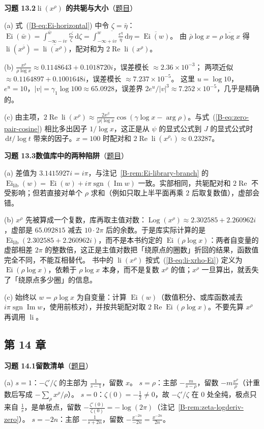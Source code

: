 \documentclass[11pt,a4paper]{article}
\DeclareMathOperator{\li}{li}
\DeclareMathOperator{\Ei}{Ei}
\newcommand{\dd}{\,\mathrm{d}}
\renewcommand{\Re}{\operatorname{Re}}
\renewcommand{\Im}{\operatorname{Im}}
\newcommand{\bref}[1]{\ref*{B-#1}}
\newcommand{\Sol}[2]{%
  \par\addvspace{1.2em}\noindent
  \hypertarget{s:#1}{}\textbf{习题 #1\quad #2}\hfill{\small（\hyperlink{q:#1}{题目}）}\par
  \nopagebreak\smallskip}
\begin{document}
\Sol{13.2}{$\li(x^\rho)$ 的共轭与大小}
(a) 式~(\bref{eq:Ei-horizontal}) 中令 $\zeta=\bar\eta$：
$\Ei(\bar w)=\int_{-\infty-iv}^{\bar w}\frac{e^\zeta}\zeta\dd\zeta=\overline{\int_{-\infty+iv}^{w}\frac{e^\eta}\eta\dd\eta}=\overline{\Ei(w)}$。
由 $\bar\rho\log x=\overline{\rho\log x}$ 得 $\li(x^{\bar\rho})=\overline{\li(x^\rho)}$，配对和为 $2\Re\li(x^\rho)$。

(b) $\frac{x^\rho}{\rho\log x}\approx0.1148643+0.1018720i$，误差模长 $\approx2.36\times10^{-3}$；
两项近似 $\approx0.1164897+0.1001648i$，误差模长 $\approx7.237\times10^{-5}$。
这里 $u=\log10$，$e^u=10$，$|v|=\gamma_1\log100\approx65.0928$，误差界 $2e^u/|v|^3\approx7.252\times10^{-5}$，几乎是精确的。

(c) 由主项，$2\Re\li(x^\rho)\approx\frac{2x^\beta}{|\rho|\log x}\cos(\gamma\log x-\arg\rho)$。与式~(\bref{eq:zero-pair-cosine}) 相比多出因子 $1/\log x$，这正是从 $\psi$ 的显式公式到 $J$ 的显式公式时 $\dd t/\log t$ 带来的因子。$x=100$ 时配对和 $2\Re\li(x^{\rho_1})\approx0.23287$。

\Sol{13.3}{数值库中的两种陷阱}
(a) 差值为 $3.1415927i=i\pi$，与注记~\bref{rem:Ei-library-branch} 的 $\Ei_{\mathrm{lib}}(w)=\Ei(w)+i\pi\operatorname{sgn}(\Im w)$ 一致。实部相同，共轭配对和 $2\Re$ 不受影响；但若直接对单个 $\rho$ 求和（例如只取上半平面再乘 $2$ 后取复数值），虚部会错。

(b) $x^\rho$ 先被算成一个复数，库再取主值对数：$\operatorname{Log}(x^\rho)\approx2.302585+2.260962i$，虚部是 $65.092815$ 减去 $10\cdot2\pi$ 后的余数。于是库实际计算的是 $\Ei_{\mathrm{lib}}(2.302585+2.260962i)$，而不是本书约定的 $\Ei(\rho\log x)$：两者自变量的虚部相差 $2\pi$ 的整数倍，这正是主值对数把「绕原点的圈数」折回的结果，函数值完全不同，不能互相替代。
书中的 $\li(x^\rho)$ 按式~(\bref{eq:li-xrho-Ei}) 定义为 $\Ei(\rho\log x)$，依赖于 $\rho\log x$ 本身，而不是复数 $x^\rho$ 的值；$x^\rho$ 一旦算出，就丢失了「绕原点多少圈」的信息。

(c) 始终以 $w=\rho\log x$ 为自变量：计算 $\Ei(w)$（数值积分、或库函数减去 $i\pi\operatorname{sgn}\Im w$，使用前核对），并按共轭配对取 $2\Re\Ei(\rho\log x)$。不要先算 $x^\rho$ 再调用 $\li$。

\subsection*{第 14 章}

\Sol{14.1}{留数清单}
(a) $s=1$：$-\zeta'/\zeta$ 的主部为 $\frac1{s-1}$，留数 $x$。
$s=\rho$：主部 $-\frac m{s-\rho}$，留数 $-m\frac{x^\rho}\rho$（计重数后写成 $-\sum_\rho x^\rho/\rho$）。
$s=0$：$\zeta(0)=-\frac12\neq0$，故 $-\zeta'/\zeta$ 在 $0$ 处全纯，极点只来自 $\frac1s$，是单极点，留数 $-\frac{\zeta'(0)}{\zeta(0)}=-\log(2\pi)$（注记~\bref{rem:zeta-logderiv-zero}）。
$s=-2n$：主部 $-\frac1{s+2n}$，留数 $-\frac{x^{-2n}}{-2n}=\frac{x^{-2n}}{2n}$。
\end{document}
